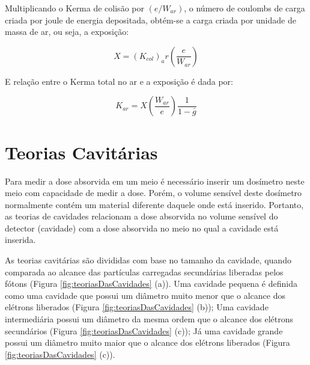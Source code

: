 \documentclass[11pt,a4paper]{article}
\begin{document}
		Multiplicando o Kerma de colisão por $(e/W_{ar})$, o número de coulombs de carga criada por joule de energia depositada, obtém-se a carga criada por unidade de massa de ar, ou seja, a exposição:

			\begin{equation}
				X = (K_{col})_ar \left(\frac{e}{W_{ar}}\right)
			\end{equation}

		E relação entre o Kerma total no ar e a exposição é dada por:

			\begin{equation}
				K_{ar} = X \left(\frac{W_{ar}}{e}\right) \frac{1}{1 - \bar{g}}
			\end{equation}

	\section{Teorias Cavitárias}

		Para medir a dose absorvida em um meio é necessário inserir um dosímetro neste meio com capacidade de medir a dose. Porém, o volume sensível deste dosímetro normalmente contém um material diferente daquele onde está inserido. Portanto, as teorias de cavidades relacionam a dose absorvida no volume sensível do detector (cavidade) com a dose absorvida no meio no qual a cavidade está inserida. 

		As teorias cavitárias são divididas com base no tamanho da cavidade, quando comparada ao alcance das partículas carregadas secundárias liberadas pelos fótons (Figura \ref{fig:teoriasDasCavidades} (a)). Uma cavidade pequena é definida como uma cavidade que possui um diâmetro muito menor que o alcance dos elétrons liberados (Figura \ref{fig:teoriasDasCavidades} (b)); Uma cavidade intermediária possui um diâmetro da mesma ordem que o alcance dos elétrons secundários (Figura \ref{fig:teoriasDasCavidades} (c)); Já uma cavidade grande possui um diâmetro muito maior que o alcance dos elétrons liberados (Figura \ref{fig:teoriasDasCavidades} (c)). 
\end{document}
